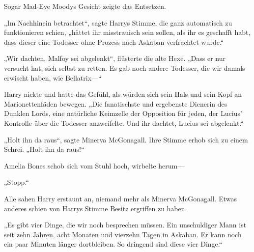 Sogar Mad-Eye Moodys Gesicht zeigte das Entsetzen.

„Im Nachhinein betrachtet“, sagte Harrys Stimme, die ganz automatisch zu funktionieren schien, „hättet ihr misstrauisch sein sollen, als ihr es geschafft habt, dass dieser eine Todesser ohne Prozess nach Askaban verfrachtet wurde.“

„Wir dachten, Malfoy sei abgelenkt“, flüsterte die alte Hexe. „Dass er nur versucht hat, sich selbst zu retten. Es gab noch andere Todesser, die wir damals erwischt haben, wie Bellatrix—“

Harry nickte und hatte das Gefühl, als würden sich sein Hals und sein Kopf an Marionettenfäden bewegen.
„Die fanatischste und ergebenste Dienerin des Dunklen Lords, eine natürliche Keimzelle der Opposition für jeden, der Lucius' Kontrolle über die Todesser anzweifelte. Und ihr dachtet, Lucius sei abgelenkt.“

„Holt ihn da raus“, sagte Minerva McGonagall. Ihre Stimme erhob sich zu einem Schrei. „Holt ihn da raus!“

Amelia Bones schob sich vom Stuhl hoch, wirbelte herum—

„Stopp.“

Alle sahen Harry erstaunt an, niemand mehr als Minerva McGonagall. Etwas anderes schien von Harrys Stimme Besitz ergriffen zu haben.

„Es gibt vier Dinge, die wir noch besprechen müssen. Ein unschuldiger Mann ist seit zehn Jahren, acht Monaten und vierzehn Tagen in Askaban. Er kann noch ein paar Minuten länger dortbleiben. So dringend sind diese vier Dinge.“

